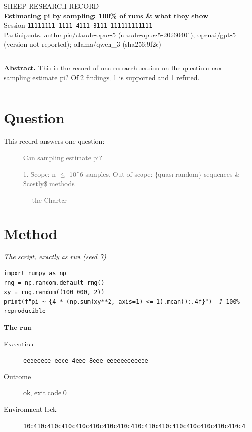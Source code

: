 \documentclass[11pt,a4paper]{article}
\newcommand{\sheepquote}[2]{\begin{quote}\small #1\par\nopagebreak\raggedleft--- #2\end{quote}}
\begin{document}
\thispagestyle{fancy}
\begin{flushleft}
{\small\sffamily\color{sheepgreen}SHEEP RESEARCH RECORD}\\[0.6em]
{\LARGE\sffamily\bfseries Estimating pi by sampling: 100\% of runs \& what they show}\\[0.8em]
{\small Session \texttt{11111111\allowbreak{}-\allowbreak{}1111\allowbreak{}-\allowbreak{}4111\allowbreak{}-\allowbreak{}8111\allowbreak{}-\allowbreak{}11111111\allowbreak{}1111}}\\[0.4em]
{\small Participants: anthropic/claude-opus-5 (claude-opus-5-20260401); openai/gpt-5 (version not reported); ollama/qwen\_3 (sha256:9f2c)}
\end{flushleft}
\vspace{0.5em}\hrule\vspace{0.8em}
\noindent\textbf{Abstract.}
This is the record of one research session on the question: can sampling estimate pi?
Of 2 findings, 1 is supported and 1 refuted.
\vspace{0.8em}\hrule

\section{Question}

This record answers one question:

\sheepquote{Can sampling estimate pi?

1. Scope: n $\leq$ 10\textasciicircum{}6 samples\newline
2. Out of scope: \{quasi-random\} sequences \& \$costly\$ methods}{the Charter}

\section{Method}

\noindent\textit{The script, exactly as run (seed 7)}
\begin{lstlisting}
import numpy as np
rng = np.random.default_rng()
xy = rng.random((100_000, 2))
print(f"pi ~ {4 * (np.sum(xy**2, axis=1) <= 1).mean():.4f}")  # 100% reproducible
\end{lstlisting}

\noindent\textbf{The run}
\begin{description}
\item[Execution] \texttt{eeeeeeee\allowbreak{}-\allowbreak{}eeee\allowbreak{}-\allowbreak{}4eee\allowbreak{}-\allowbreak{}8eee\allowbreak{}-\allowbreak{}eeeeeeee\allowbreak{}eeee}
\item[Outcome] ok, exit code 0
\item[Environment lock] \texttt{10c410c4\allowbreak{}10c410c4\allowbreak{}10c410c4\allowbreak{}10c410c4\allowbreak{}10c410c4\allowbreak{}10c410c4\allowbreak{}10c410c4\allowbreak{}10c410c4}
\end{description}
\end{document}
